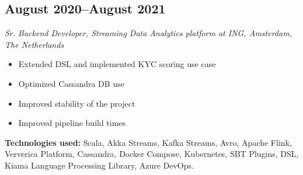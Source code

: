 \subsection*{August 2020--August 2021}

\textit{Sr. Backend Developer, Streaming Data Analytics platform at ING, Amsterdam, The Netherlands}

\begin{itemize}[noitemsep]
  \item Extended DSL and implemented KYC scoring use case
  \item Optimized Cassandra DB use
  \item Improved stability of the project
  \item Improved pipeline build times
\end{itemize}

\textbf{Technologies used:}
Scala, Akka Streams, Kafka Streams, Avro, Apache Flink, Ververica Platform, Cassandra, Docker Compose, Kubernetes,
SBT Plugins, DSL, Kiama Language Processing Library, Azure DevOps.
